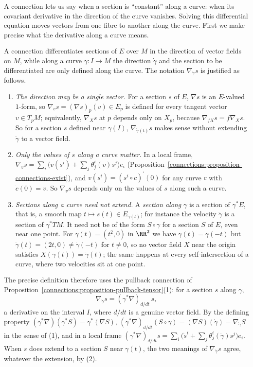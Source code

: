 A connection lets us say when a section is ``constant'' along a curve: when its covariant derivative in the direction of the curve vanishes. Solving this differential
equation moves vectors from one fibre to another along the curve. First we make precise what the derivative along a curve means.

\begin{remark}\label{connections:remark-along-curves}
A connection differentiates sections of $E$ over $M$ in the direction of vector fields on $M$, while along a curve $\gamma \colon I \to M$ the direction $\dot\gamma$ and
the section to be differentiated are only defined along the curve. The notation $\nabla_{\dot\gamma}s$ is justified as follows.
\begin{enumerate}
\item \emph{The direction may be a single vector.} For a section $s$ of $E$, $\nabla s$ is an $E$-valued $1$-form, so $\nabla_vs = (\nabla s)_p(v) \in E_p$ is defined for
every tangent vector $v \in T_pM$; equivalently, $\nabla_Xs$ at $p$ depends only on $X_p$, because $\nabla_{fX}s = f\nabla_Xs$. So for a section $s$ defined near
$\gamma(I)$, $\nabla_{\dot\gamma(t)}s$ makes sense without extending $\dot\gamma$ to a vector field.
\item \emph{Only the values of $s$ along a curve matter.} In a local frame, $\nabla_vs = \sum_i\bigl(v(s^i) + \sum_j\theta^i_j(v)s^j\bigr)e_i$
(Proposition~\ref{connections:proposition-connections-exist}), and $v(s^i) = (s^i \circ c)^{\prime}(0)$ for any curve $c$ with $\dot c(0) = v$. So $\nabla_vs$ depends
only on the values of $s$ along such a curve.
\item \emph{Sections along a curve need not extend.} A \emph{section along $\gamma$} is a section of $\gamma^*E$, that is, a smooth map $t \mapsto s(t) \in E_{\gamma(t)}$;
for instance the velocity $\dot\gamma$ is a section of $\gamma^*TM$. It need not be of the form $S \circ \gamma$ for a section $S$ of $E$, even near one point. For
$\gamma(t) = (t^2, 0)$ in $\RR^2$ we have $\gamma(t) = \gamma(-t)$ but $\dot\gamma(t) = (2t, 0) \neq \dot\gamma(-t)$ for $t \neq 0$, so no vector field $X$ near the origin
satisfies $X(\gamma(t)) = \dot\gamma(t)$; the same happens at every self-intersection of a curve, where two velocities sit at one point.
\end{enumerate}
The precise definition therefore uses the pullback connection of Proposition~\ref{connections:proposition-pullback-tensor}(1): for a section $s$ along $\gamma$,
\[
\nabla_{\dot\gamma}s = (\gamma^*\nabla)_{d/dt}\,s ,
\]
a derivative on the interval $I$, where $d/dt$ is a genuine vector field. By the defining property $(\gamma^*\nabla)(\gamma^*S) = \gamma^*(\nabla S)$,
$(\gamma^*\nabla)_{d/dt}(S \circ \gamma) = (\nabla S)(\dot\gamma) = \nabla_{\dot\gamma}S$ in the sense of (1), and in a local frame
$(\gamma^*\nabla)_{d/dt}s = \sum_i\bigl(\dot s^i + \sum_j\theta^i_j(\dot\gamma)s^j\bigr)e_i$. When $s$ does extend to a section $S$ near $\gamma(t)$, the two meanings of
$\nabla_{\dot\gamma}s$ agree, whatever the extension, by (2).
\end{remark}

